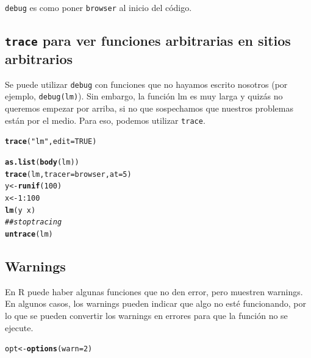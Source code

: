 \documentclass{config/apuntes}\usepackage[]{graphicx}\usepackage[]{xcolor}
\makeatletter
\newcommand{\hlnum}[1]{\textcolor[rgb]{0.686,0.059,0.569}{#1}}%
\newcommand{\hlsng}[1]{\textcolor[rgb]{0.192,0.494,0.8}{#1}}%
\newcommand{\hlcom}[1]{\textcolor[rgb]{0.678,0.584,0.686}{\textit{#1}}}%
\newcommand{\hlopt}[1]{\textcolor[rgb]{0,0,0}{#1}}%
\newcommand{\hldef}[1]{\textcolor[rgb]{0.345,0.345,0.345}{#1}}%
\newcommand{\hlkwb}[1]{\textcolor[rgb]{0.69,0.353,0.396}{#1}}%
\newcommand{\hlkwc}[1]{\textcolor[rgb]{0.333,0.667,0.333}{#1}}%
\newcommand{\hlkwd}[1]{\textcolor[rgb]{0.737,0.353,0.396}{\textbf{#1}}}%
\newenvironment{kframe}{%
 \def\at@end@of@kframe{}%
 \ifinner\ifhmode%
  \def\at@end@of@kframe{\end{minipage}}%
  \begin{minipage}{\columnwidth}%
 \fi\fi%
 \def\FrameCommand##1{\hskip\@totalleftmargin \hskip-\fboxsep
 \colorbox{shadecolor}{##1}\hskip-\fboxsep
     \hskip-\linewidth \hskip-\@totalleftmargin \hskip\columnwidth}%
 \MakeFramed {\advance\hsize-\width
   \@totalleftmargin\z@ \linewidth\hsize
   \@setminipage}}%
 {\par\unskip\endMakeFramed%
 \at@end@of@kframe}
\newenvironment{knitrout}{}{} %
\newcommand{\code}[1]{\texttt{#1}}
\makeatother
\begin{document}
\code{debug} es como poner \code{browser} al inicio del código.

\subsection{\code{trace} para ver funciones arbitrarias en sitios arbitrarios}
Se puede utilizar \code{debug} con funciones que no hayamos escrito nosotros (por ejemplo, \code{debug(lm)}). Sin embargo, la función lm es muy larga y quizás no queremos empezar por arriba, si no que sospechamos que nuestros problemas están por el medio. Para eso, podemos utilizar \code{trace}.

\begin{knitrout}
\color{fgcolor}\begin{kframe}
\begin{alltt}
\hlkwd{trace}\hldef{(}\hlsng{"lm"}\hldef{,} \hlkwc{edit} \hldef{=} \hlnum{TRUE}\hldef{)}
\end{alltt}
\end{kframe}
\end{knitrout}

\begin{knitrout}
\color{fgcolor}\begin{kframe}
\begin{alltt}
\hlkwd{as.list}\hldef{(}\hlkwd{body}\hldef{(lm))}
\hlkwd{trace}\hldef{(lm,} \hlkwc{tracer} \hldef{= browser,} \hlkwc{at} \hldef{=} \hlnum{5}\hldef{)}
\hldef{y} \hlkwb{<-} \hlkwd{runif}\hldef{(}\hlnum{100}\hldef{)}
\hldef{x} \hlkwb{<-} \hlnum{1}\hlopt{:}\hlnum{100}
\hlkwd{lm}\hldef{(y} \hlopt{~} \hldef{x)}
\hlcom{## stop tracing}
\hlkwd{untrace}\hldef{(lm)}
\end{alltt}
\end{kframe}
\end{knitrout}

\subsection{Warnings}
En R puede haber algunas funciones que no den error, pero muestren warnings. En algunos casos, los warnings pueden indicar que algo no esté funcionando, por lo que se pueden convertir los warnings en errores para que la función no se ejecute. 

\begin{knitrout}
\color{fgcolor}\begin{kframe}
\begin{alltt}
\hldef{opt} \hlkwb{<-} \hlkwd{options}\hldef{(}\hlkwc{warn} \hldef{=} \hlnum{2}\hldef{)}
\end{alltt}
\end{kframe}
\end{knitrout}
\end{document}

